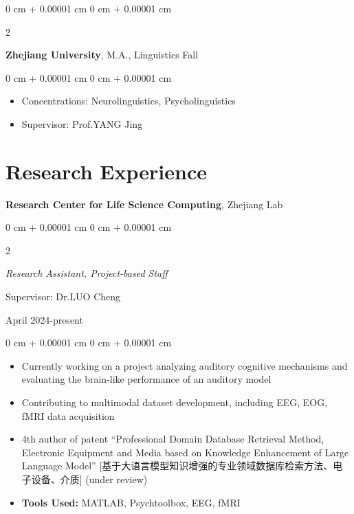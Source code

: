 \documentclass[10pt, letterpaper]{article}
\newenvironment{highlights}{
    \begin{itemize}[
        topsep=0.10 cm,
        parsep=0.10 cm,
        partopsep=0pt,
        itemsep=0pt,
        leftmargin=0 cm + 10pt
    ]
}{
    \end{itemize}
} %
\newenvironment{onecolentry}{
    \begin{adjustwidth}{
        0 cm + 0.00001 cm
    }{
        0 cm + 0.00001 cm
    }
}{
    \end{adjustwidth}
} %
\newenvironment{twocolentry}[2][]{
    \onecolentry
    \def\secondColumn{#2}
    \setcolumnwidth{\fill, 4.5 cm}
    \begin{paracol}{2}
}{
    \switchcolumn \raggedleft \secondColumn
    \end{paracol}
    \endonecolentry
} %
\begin{document}
    \vspace{0.3 cm}

    \begin{twocolentry}{
       2025 Fall
    }
        \textbf{Zhejiang University}, M.A., Linguistics\end{twocolentry}
    
    \vspace{0.10 cm}
    \begin{onecolentry}
        \begin{highlights}
            \item Concentrations: Neurolinguistics, Psycholinguistics
            \item Supervisor: Prof.YANG Jing
        \end{highlights}
    \end{onecolentry}

\section{Research Experience}


\textbf{Research Center for Life Science Computing}, Zhejiang Lab

\vspace{0.10 cm}

    \begin{twocolentry}{
        April 2024-present
    }
        \textit{Research Assistant, Project-based Staff}
        \item Supervisor: Dr.LUO Cheng
    \end{twocolentry}

    \vspace{0.10 cm}
    \begin{onecolentry}
        \begin{highlights}
            \item Currently working on a project analyzing auditory cognitive mechanisms and evaluating the brain-like performance of an auditory model
            \item Contributing to multimodal dataset development, including EEG, EOG, fMRI data acquisition
            \item 4th author of patent “Professional Domain Database Retrieval Method, Electronic Equipment and Media based on Knowledge Enhancement of Large Language Model” [基于大语言模型知识增强的专业领域数据库检索方法、电子设备、介质] (under review)
            \item \textbf{Tools Used:} MATLAB, Psychtoolbox, EEG, fMRI
        \end{highlights}
    \end{onecolentry}
\end{document}
